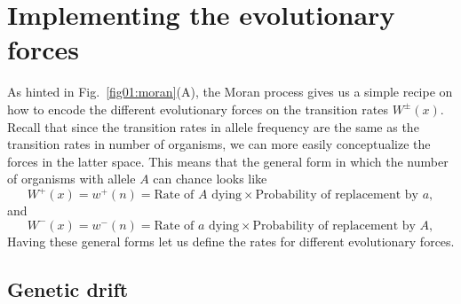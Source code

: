 \section{Implementing the evolutionary forces}

As hinted in Fig.~\ref{fig01:moran}(A), the Moran process gives us a simple
recipe on how to encode the different evolutionary forces on the transition
rates $W^\pm(x)$. Recall that since the transition rates in allele frequency are
the same as the transition rates in number of organisms, we can more easily
conceptualize the forces in the latter space. This means that the general form
in which the number of organisms with allele $A$ can chance looks like
\begin{equation}
    W^+(x) = w^+(n) = 
    \text{Rate of $A$ dying} \times
    \text{Probability of replacement by $a$},
\end{equation}
and 
\begin{equation}
    W^-(x) = w^-(n) = 
    \text{Rate of $a$ dying} \times
    \text{Probability of replacement by $A$},
\end{equation}
Having these general forms let us define the rates for different evolutionary
forces.

\subsection{Genetic drift}

